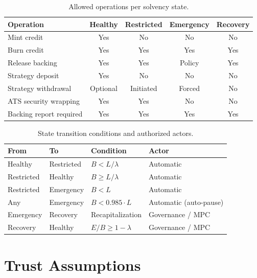 \documentclass[11pt,twocolumn]{article}
\theoremstyle{remark}
\begin{document}
\begin{table}[t]
\centering
\caption{Allowed operations per solvency state.}
\label{tab:state-ops}
\small
\begin{tabular}{@{}lcccc@{}}
\toprule
\textbf{Operation} & \textbf{Healthy} & \textbf{Restricted} & \textbf{Emergency} & \textbf{Recovery} \\
\midrule
Mint credit             & Yes      & No        & No      & No \\
Burn credit             & Yes      & Yes       & Yes     & Yes \\
Release backing         & Yes      & Yes       & Policy  & Yes \\
Strategy deposit        & Yes      & No        & No      & No \\
Strategy withdrawal     & Optional & Initiated & Forced  & No \\
ATS security wrapping   & Yes      & Yes       & No      & No \\
Backing report required & Yes      & Yes       & Yes     & Yes \\
\bottomrule
\end{tabular}
\end{table}

\begin{table}[t]
\centering
\caption{State transition conditions and authorized actors.}
\label{tab:transitions}
\small
\begin{tabular}{@{}llll@{}}
\toprule
\textbf{From} & \textbf{To} & \textbf{Condition} & \textbf{Actor} \\
\midrule
Healthy    & Restricted & $B < L / \lambda$       & Automatic \\
Restricted & Healthy    & $B \geq L / \lambda$    & Automatic \\
Restricted & Emergency  & $B < L$                  & Automatic \\
Any        & Emergency  & $B < 0.985 \cdot L$      & Automatic (auto-pause) \\
Emergency  & Recovery   & Recapitalization          & Governance / MPC \\
Recovery   & Healthy    & $E/B \geq 1 - \lambda$   & Governance / MPC \\
\bottomrule
\end{tabular}
\end{table}


\section{Trust Assumptions}
\label{sec:trust}
\end{document}
